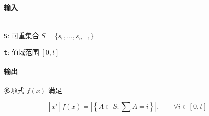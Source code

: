 \paragraph{输入}~\\

\verb|S|: 可重集合 \(S=\{s_0,\dots,s_{n-1}\}\)

\verb|t|: 值域范围 \([0,t]\)

\paragraph{输出}

多项式 \(f(x)\) 满足

\[
    \left[x^i\right]f(x)=\left|\left\{A\subset S:\sum A=i\right\}\right|,\qquad \forall i\in[0,t]
\]
